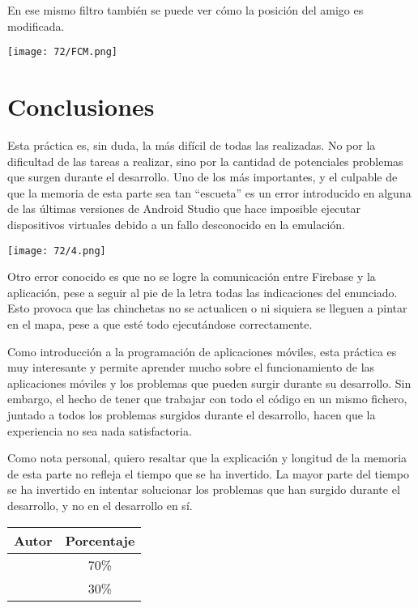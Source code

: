 En ese mismo filtro también se puede ver cómo la posición del amigo es modificada.

\begin{minipage}{\linewidth}
	\centering
	\texttt{[image: 72/FCM.png]}
	\label{fig:72/9}
\end{minipage}

\section{Conclusiones}
Esta práctica es, sin duda, la más difícil de todas las realizadas. No por la dificultad de las
tareas a realizar, sino por la cantidad de potenciales problemas que surgen durante el desarrollo.
Uno de los más importantes, y el culpable de que la memoria de esta parte sea tan ``escueta'' es
un error introducido en alguna de las últimas versiones de Android Studio que hace imposible
ejecutar dispositivos virtuales debido a un fallo desconocido en la emulación.

\begin{minipage}{\linewidth}
	\centering
	\texttt{[image: 72/4.png]}
	\label{fig:72/100000}
\end{minipage}

Otro error conocido es que no se logre la comunicación entre Firebase y la aplicación, pese a seguir
al pie de la letra todas las indicaciones del enunciado. Esto provoca que las chinchetas no se
actualicen o ni siquiera se lleguen a pintar en el mapa, pese a que esté todo ejecutándose correctamente.

Como introducción a la programación de aplicaciones móviles, esta práctica es muy interesante y
permite aprender mucho sobre el funcionamiento de las aplicaciones móviles y los problemas que
pueden surgir durante su desarrollo. Sin embargo, el hecho de tener que trabajar con todo el código en
un mismo fichero, juntado a todos los problemas surgidos durante el desarrollo, hacen que la experiencia no sea
nada satisfactoria.

Como nota personal, quiero resaltar que la explicación y longitud de la memoria de esta parte no refleja
el tiempo que se ha invertido. La mayor parte del tiempo se ha invertido en intentar solucionar los
problemas que han surgido durante el desarrollo, y no en el desarrollo en sí.

\begin{center}
	\begin{tabular}{|c|c|}
		\hline
		\textbf{Autor} & \textbf{Porcentaje} \\
		\hline
		\hline
		\authorOne & 70\% \\
		\authorTwo & 30\% \\
		\hline
	\end{tabular}
\end{center}
